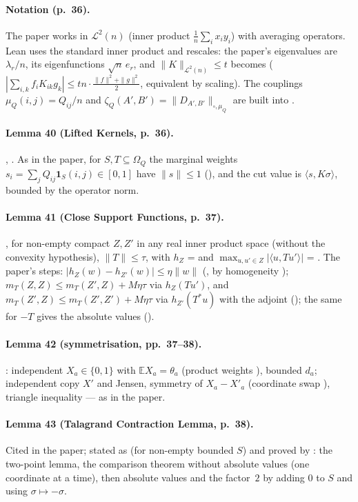 \paragraph{Notation (p.~36).} The paper works in $\mathcal L^2(n)$ (inner product $\frac1n\sum_ix_iy_i$) with
averaging operators. Lean uses the standard inner product and rescales: the paper's eigenvalues are $\lambda_r/n$,
its eigenfunctions $\sqrt n\,e_r$, and $\|K\|_{\mathcal L^2(n)}\le t$ becomes 
($|\sum_{i,k}f_iK_{ik}g_k|\le tn\cdot\frac{\|f\|^2+\|g\|^2}2$, equivalent by scaling). The couplings $\mu_Q(i,j)=Q_{ij}/n$
and $\zeta_Q(A',B')=\|D_{A',B'}\|_{\square,\mu_Q}$ are built into .

\paragraph{Lemma 40 (Lifted Kernels, p.~36).} , . As in the paper, for
$S,T\subseteq\Omega_Q$ the marginal weights $s_i=\sum_jQ_{ij}\mathbf 1_S(i,j)\in[0,1]$ have $\|s\|\le1$
(), and the cut value is $\langle s,K\sigma\rangle$, bounded by the operator norm.

\paragraph{Lemma 41 (Close Support Functions, p.~37).} , for non-empty compact
$Z,Z'$ in any real inner product space (without the convexity hypothesis), $\|T\|\le\tau$, with $h_Z$ =  and
$\max_{u,u'\in Z}|\langle u,Tu'\rangle|$ = . The paper's steps: $|h_Z(w)-h_{Z'}(w)|\le\eta\|w\|$
(, by homogeneity ); $m_T(Z,Z)\le m_T(Z',Z)+M\eta\tau$ via
$h_Z(Tu')$, and $m_T(Z',Z)\le m_T(Z',Z')+M\eta\tau$ via $h_{Z'}(T^*u)$ with the adjoint ();
the same for $-T$ gives the absolute values ().

\paragraph{Lemma 42 (symmetrisation, pp.~37--38).} : independent $X_a\in\{0,1\}$ with
$\mathbb E X_a=\theta_a$ (product weights ), bounded $d_a$; independent copy $X'$ and Jensen, symmetry of
$X_a-X'_a$ (coordinate swap ), triangle inequality --- as in the paper.

\paragraph{Lemma 43 (Talagrand Contraction Lemma, p.~38).} Cited in the paper; stated as 
(for non-empty bounded $S$) and proved by : the two-point lemma, the comparison
theorem without absolute values (one coordinate at a time), then absolute values and the factor~$2$ by adding $0$
to $S$ and using $\sigma\mapsto-\sigma$.

